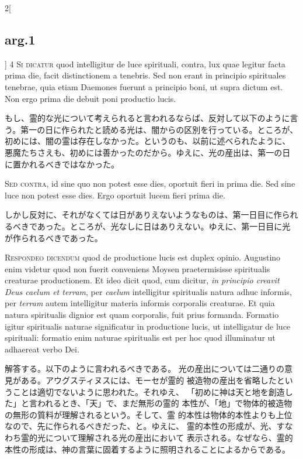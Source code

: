 \documentclass[paper=a4paper,fontsize=10pt,jafontsize=9pt,titlepage]{jlreq}
\begin{document}
\begin{paracol}{2}[\subsection{arg.1}]
{\scshape 4 Si dicatur} quod intelligitur de luce
spirituali, contra, lux quae legitur facta prima die, facit
distinctionem a tenebris. Sed non erant in principio spirituales
tenebrae, quia etiam Daemones fuerunt a principio boni, ut supra dictum
est. Non ergo prima die debuit poni productio lucis.

\switchcolumn

もし、霊的な光について考えられると言われるならば、反対して以下のように言
 う。第一の日に作られたと読める光は、闇からの区別を行っている。ところが、
 初めには、闇の霊は存在しなかった。というのも、以前に述べられたように、
 悪魔たちさえも、初めには善かったのだから。ゆえに、光の産出は、第一の日
 に置かれるべきではなかった。

\switchcolumn*[\subsection{s.c.}]

{\scshape  Sed contra}, id sine quo non potest esse
dies, oportuit fieri in prima die. Sed sine luce non potest esse
dies. Ergo oportuit lucem fieri prima die.

\switchcolumn

しかし反対に、それがなくては日がありえないようなものは、第一日目に作られ
 るべきであった。ところが、光なしに日はありえない。ゆえに、第一日目に光
 が作られるべきであった。


{\scshape Respondeo dicendum} quod de productione lucis
est duplex opinio. Augustino enim videtur quod non fuerit conveniens
Moysen praetermisisse spiritualis creaturae productionem. Et ideo dicit
quod, cum dicitur, {\itshape in principio creavit Deus caelum et terram}, per
{\itshape caelum} intelligitur spiritualis natura adhuc informis, per {\itshape terram} autem
intelligitur materia informis corporalis creaturae. Et quia natura
spiritualis dignior est quam corporalis, fuit prius formanda. Formatio
igitur spiritualis naturae significatur in productione lucis, ut
intelligatur de luce spirituali: formatio enim naturae spiritualis est
per hoc quod illuminatur ut adhaereat verbo Dei.

\switchcolumn

解答する。以下のように言われるべきである。
光の産出については二通りの意見がある。アウグスティヌスには、モーセが霊的
 被造物の産出を省略したということは適切でないように思われた。それゆえ、
 「初めに神は天と地を創造した」と言われるとき、「天」で、まだ無形の霊的
 本性が、「地」で物体的被造物の無形の質料が理解されるという。そして、霊
 的本性は物体的本性よりも上位なので、先に作られるべきだった、と。ゆえに、
 霊的本性の形成が、光、すなわち霊的光について理解される光の産出において
 表示される。なぜなら、霊的本性の形成は、神の言葉に固着するように照明されることによるからである。


\end{paracol}
\end{document}
